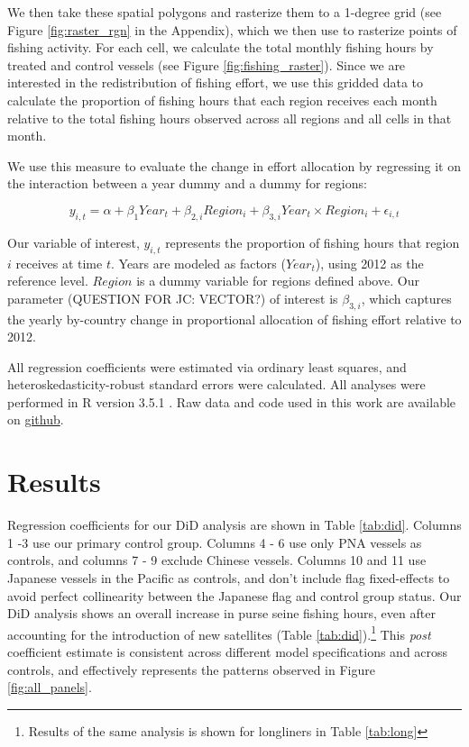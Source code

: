 \documentclass[11pt,english]{article}
\begin{document}
We then take these spatial polygons and rasterize them to a 1-degree grid
(see Figure \ref{fig:raster_rgn} in the Appendix), which we then use to rasterize points
of fishing activity. For each cell, we calculate the total monthly
fishing hours by treated and control vessels (see Figure
\ref{fig:fishing_raster}). Since we are interested in the redistribution
of fishing effort, we use this gridded data to calculate the proportion
of fishing hours that each region receives each month relative to the
total fishing hours observed across all regions and all cells in that
month.

We use this measure to evaluate the change in effort allocation by
regressing it on the interaction between a year dummy and a dummy for
regions:

\[
y_{i,t} = \alpha + \beta_1Year_t + \beta_{2,i}Region_i + \beta_{3,i}Year_t \times Region_i+ \epsilon_{i,t}
\]

Our variable of interest, \(y_{i,t}\) represents the proportion of
fishing hours that region \(i\) receives at time \(t\). Years are
modeled as factors (\(Year_t\)), using 2012 as the reference level.
\(Region\) is a dummy variable for regions defined above. Our parameter (QUESTION FOR JC: VECTOR?)
of interest is \(\beta_{3,i}\), which captures the yearly by-country
change in proportional allocation of fishing effort relative to 2012.

All regression coefficients were estimated via ordinary least squares,
and heteroskedasticity-robust standard errors were calculated. All analyses
were performed in R version 3.5.1 \citep{rcore_2018}. Raw data and code
used in this work are available on
\href{https://github.com/jcvdav/MPA_displacement}{github}.

\section{Results}\label{results}

Regression coefficients for our DiD analysis are shown in Table
\ref{tab:did}. Columns 1 -3 use our primary control group. Columns 4 - 6 use
only PNA vessels as controls, and columns 7 - 9 exclude Chinese vessels.
Columns 10 and 11 use Japanese vessels in the Pacific as controls, and
don't include flag fixed-effects to avoid perfect collinearity
between the Japanese flag and
control group status.
Our DiD analysis shows an overall increase in purse seine fishing hours,
even after accounting for the introduction of new satellites (Table
\ref{tab:did}).\footnote{Results of the same analysis is shown for longliners in Table \ref{tab:long}} This 
\emph{post} coefficient estimate is consistent across different
model specifications and across controls, and
effectively represents the patterns observed in Figure
\ref{fig:all_panels}.
\end{document}
